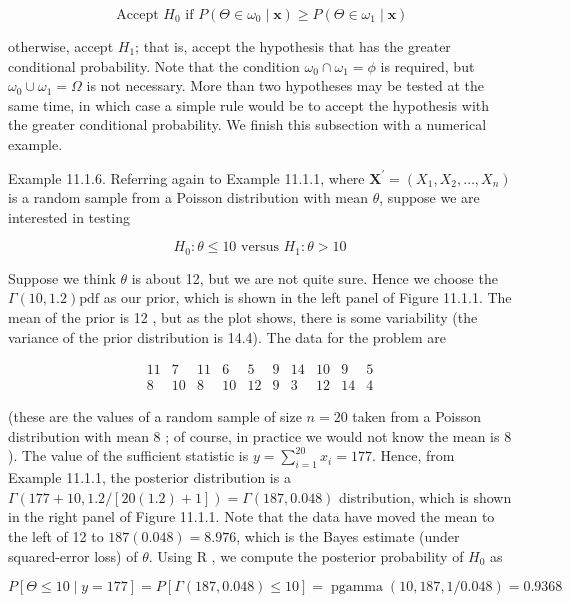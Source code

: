 $$
\text { Accept } H_{0} \text { if } P\left(\Theta \in \omega_{0} \mid \mathbf{x}\right) \geq P\left(\Theta \in \omega_{1} \mid \mathbf{x}\right)
$$

otherwise, accept $H_{1}$; that is, accept the hypothesis that has the greater conditional probability. Note that the condition $\omega_{0} \cap \omega_{1}=\phi$ is required, but $\omega_{0} \cup \omega_{1}=\Omega$ is not necessary. More than two hypotheses may be tested at the same time, in which case a simple rule would be to accept the hypothesis with the greater conditional probability. We finish this subsection with a numerical example.

Example 11.1.6. Referring again to Example 11.1.1, where $\mathbf{X}^{\prime}=\left(X_{1}, X_{2}, \ldots, X_{n}\right)$ is a random sample from a Poisson distribution with mean $\theta$, suppose we are interested in testing


\begin{equation*}
H_{0}: \theta \leq 10 \text { versus } H_{1}: \theta>10 \tag{11.1.13}
\end{equation*}


Suppose we think $\theta$ is about 12, but we are not quite sure. Hence we choose the $\Gamma(10,1.2) \mathrm{pdf}$ as our prior, which is shown in the left panel of Figure 11.1.1. The mean of the prior is 12 , but as the plot shows, there is some variability (the variance of the prior distribution is 14.4). The data for the problem are

$$
\begin{array}{rrrrrrrrrr}
11 & 7 & 11 & 6 & 5 & 9 & 14 & 10 & 9 & 5 \\
8 & 10 & 8 & 10 & 12 & 9 & 3 & 12 & 14 & 4
\end{array}
$$

(these are the values of a random sample of size $n=20$ taken from a Poisson distribution with mean 8 ; of course, in practice we would not know the mean is 8 ). The value of the sufficient statistic is $y=\sum_{i=1}^{20} x_{i}=177$. Hence, from Example 11.1.1, the posterior distribution is a $\Gamma(177+10,1.2 /[20(1.2)+1])=\Gamma(187,0.048)$ distribution, which is shown in the right panel of Figure 11.1.1. Note that the data have moved the mean to the left of 12 to $187(0.048)=8.976$, which is the Bayes estimate (under squared-error loss) of $\theta$. Using R , we compute the posterior probability of $H_{0}$ as

$$
P[\Theta \leq 10 \mid y=177]=P[\Gamma(187,0.048) \leq 10]=\operatorname{pgamma}(10,187,1 / 0.048)=0.9368
$$

